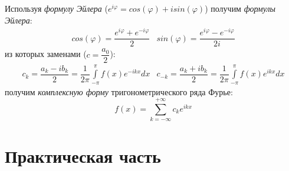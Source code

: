 \documentclass[a4paper]{article}
\begin{document}
Используя {\it формулу Эйлера} ($e^{i\varphi} = cos(\varphi) + i sin(\varphi)$)
получим {\it формулы Эйлера}:
\begin{eqnarray*}
    cos(\varphi) = \dfrac{e^{i\varphi} + e^{-i\varphi}}{2} & sin(\varphi) = \dfrac{e^{i\varphi} - e^{-i\varphi}}{2i}
\end{eqnarray*}
из которых заменами ($c = \dfrac{a_0}{2}$):
\begin{eqnarray*}
    c_k = \dfrac{a_k - ib_k}{2} = \dfrac{1}{2\pi}\int\limits_{-\pi}^{\pi} f(x)e^{-ikx}dx & c_{-k} = \dfrac{a_k + ib_k}{2} = \dfrac{1}{2\pi} \int\limits_{-\pi}^\pi f(x)e^{ikx}dx
\end{eqnarray*}
получим {\it комплексную форму} тригонометрического ряда Фурье:
\begin{equation*}
    f(x) = \sum_{k=-\infty}^{+\infty} c_k e^{ikx}
\end{equation*}

\section*{\centering Практическая часть}
\end{document}
